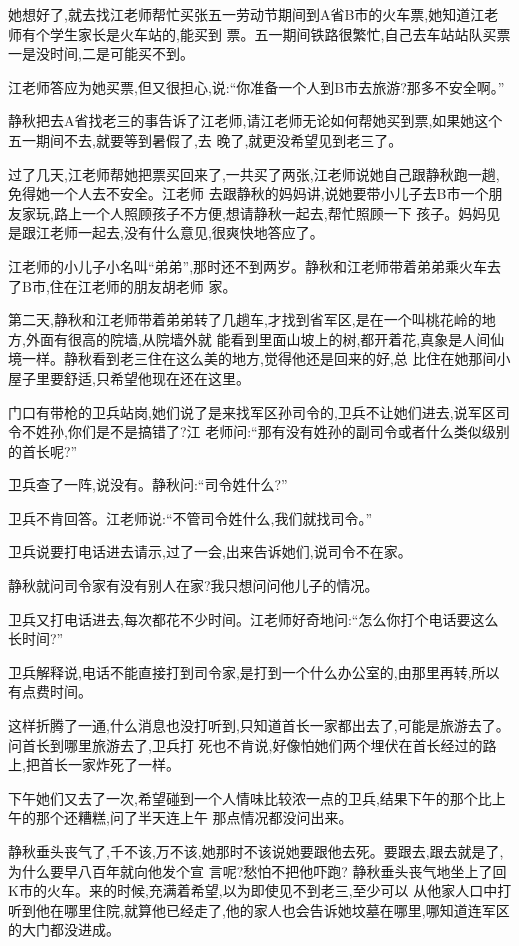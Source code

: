 ﻿\documentclass[12pt]{article}
\begin{document}
她想好了,就去找江老师帮忙买张五一劳动节期间到A省B市的火车票,她知道江老师有个学生家长是火车站的,能买到
票。五一期间铁路很繁忙,自己去车站站队买票一是没时间,二是可能买不到。

江老师答应为她买票,但又很担心,说:``你准备一个人到B市去旅游?那多不安全啊。''

静秋把去A省找老三的事告诉了江老师,请江老师无论如何帮她买到票,如果她这个五一期间不去,就要等到暑假了,去
晚了,就更没希望见到老三了。

过了几天,江老师帮她把票买回来了,一共买了两张,江老师说她自己跟静秋跑一趟,免得她一个人去不安全。江老师
去跟静秋的妈妈讲,说她要带小儿子去B市一个朋友家玩,路上一个人照顾孩子不方便,想请静秋一起去,帮忙照顾一下
孩子。妈妈见是跟江老师一起去,没有什么意见,很爽快地答应了。

江老师的小儿子小名叫``弟弟'',那时还不到两岁。静秋和江老师带着弟弟乘火车去了B市,住在江老师的朋友胡老师
家。

第二天,静秋和江老师带着弟弟转了几趟车,才找到省军区,是在一个叫桃花岭的地方,外面有很高的院墙,从院墙外就
能看到里面山坡上的树,都开着花,真象是人间仙境一样。静秋看到老三住在这么美的地方,觉得他还是回来的好,总
比住在她那间小屋子里要舒适,只希望他现在还在这里。

门口有带枪的卫兵站岗,她们说了是来找军区孙司令的,卫兵不让她们进去,说军区司令不姓孙,你们是不是搞错了?江
老师问:``那有没有姓孙的副司令或者什么类似级别的首长呢?''

卫兵查了一阵,说没有。静秋问:``司令姓什么?''

卫兵不肯回答。江老师说:``不管司令姓什么,我们就找司令。''

卫兵说要打电话进去请示,过了一会,出来告诉她们,说司令不在家。

静秋就问司令家有没有别人在家?我只想问问他儿子的情况。

卫兵又打电话进去,每次都花不少时间。江老师好奇地问:``怎么你打个电话要这么长时间?''

卫兵解释说,电话不能直接打到司令家,是打到一个什么办公室的,由那里再转,所以有点费时间。

这样折腾了一通,什么消息也没打听到,只知道首长一家都出去了,可能是旅游去了。问首长到哪里旅游去了,卫兵打
死也不肯说,好像怕她们两个埋伏在首长经过的路上,把首长一家炸死了一样。

下午她们又去了一次,希望碰到一个人情味比较浓一点的卫兵,结果下午的那个比上午的那个还糟糕,问了半天连上午
那点情况都没问出来。

静秋垂头丧气了,千不该,万不该,她那时不该说她要跟他去死。要跟去,跟去就是了,为什么要早八百年就向他发个宣
言呢?愁怕不把他吓跑? 静秋垂头丧气地坐上了回K市的火车。来的时候,充满着希望,以为即使见不到老三,至少可以
从他家人口中打听到他在哪里住院,就算他已经走了,他的家人也会告诉她坟墓在哪里,哪知道连军区的大门都没进成。
\end{document}
